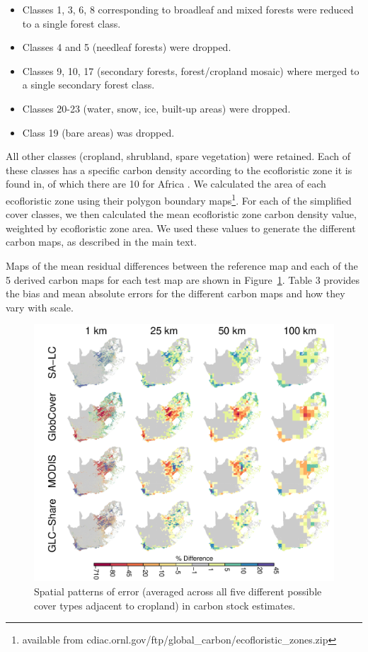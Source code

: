 \documentclass[12pt, titlepage]{article}
\begin{document}
\begin{itemize}
\item Classes 1, 3, 6, 8 corresponding to broadleaf and mixed forests were reduced to a single forest class.
\item Classes 4 and 5 (needleaf forests) were dropped. 
\item Classes 9, 10, 17 (secondary forests, forest/cropland mosaic) where merged to a single secondary forest class.
\item Classes 20-23 (water, snow, ice, built-up areas) were dropped.
\item Class 19 (bare areas) was dropped.
\end{itemize}

All other classes (cropland, shrubland, spare vegetation) were retained. Each of these classes has a specific carbon density according to the ecofloristic zone it is found in, of which there are 10 for Africa \citep[Zones 6-9 and 10-15; see][]{ruesch_new_2008}. We calculated the area of each ecofloristic zone using their polygon boundary maps\footnote{available from cdiac.ornl.gov/ftp/global\_carbon/ecofloristic\_zones.zip}. For each of the simplified cover classes, we then calculated the mean ecofloristic zone carbon density value, weighted by ecofloristic zone area. We used these values to generate the different carbon maps, as described in the main text.  

Maps of the mean residual differences between the reference map and each of the 5 derived carbon maps for each test map are shown in Figure~\ref{fig:carbon}. Table 3 provides the bias and mean absolute errors for the different carbon maps and how they vary with scale.  

\begin{figure}[!ht]
  \centering
     \includegraphics[width = 12cm]{figures/carbon_bias_map.pdf} 
      \caption{Spatial patterns of error (averaged across all five different possible cover types adjacent to cropland) in carbon stock estimates. }
      \label{fig:carbon}
\end{figure}
\end{document}
